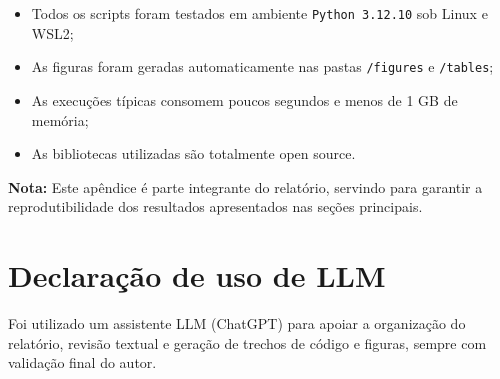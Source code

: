 \documentclass[12pt,a4paper]{article}
\begin{document}
\begin{itemize}
    \item Todos os scripts foram testados em ambiente \texttt{Python 3.12.10} sob Linux e WSL2;
    \item As figuras foram geradas automaticamente nas pastas \texttt{/figures} e \texttt{/tables};
    \item As execuções típicas consomem poucos segundos e menos de 1 GB de memória;
    \item As bibliotecas utilizadas são totalmente open source.
\end{itemize}

\bigskip
\textbf{Nota:} Este apêndice é parte integrante do relatório, servindo para garantir a reprodutibilidade dos resultados apresentados nas seções principais.


\section{Declaração de uso de LLM}
Foi utilizado um assistente LLM (ChatGPT) para apoiar a organização do relatório, revisão textual e geração de trechos de código e figuras, sempre com validação final do autor.
\end{document}
